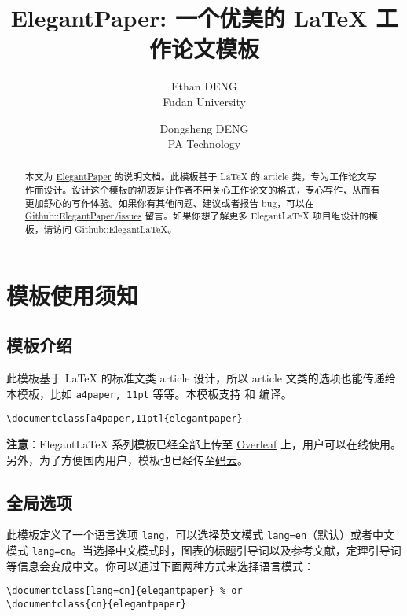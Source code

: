 \documentclass[lang=cn,11pt,a4paper]{elegantpaper}
\title{ElegantPaper: 一个优美的 \LaTeX{} 工作论文模板}
\author{Ethan DENG \\ Fudan University \and Dongsheng DENG \\ PA Technology}
\institute{\href{https://elegantlatex.org/}{Elegant\LaTeX{} 项目组}}
\date{\zhtoday}
\begin{document}
\maketitle

\begin{abstract}
本文为 \href{https://github.com/ElegantLaTeX/ElegantPaper/}{ElegantPaper} 的说明文档。此模板基于 \LaTeX{} 的 article 类，专为工作论文写作而设计。设计这个模板的初衷是让作者不用关心工作论文的格式，专心写作，从而有更加舒心的写作体验。如果你有其他问题、建议或者报告 bug，可以在 \href{https://github.com/ElegantLaTeX/ElegantPaper/issues}{Github::ElegantPaper/issues} 留言。如果你想了解更多 Elegant\LaTeX{} 项目组设计的模板，请访问 \href{https://github.com/ElegantLaTeX/}{Github::ElegantLaTeX}。
\end{abstract}



\section{模板使用须知}

\subsection{模板介绍}

此模板基于 \LaTeX{} 的标准文类 article 设计，所以 article 文类的选项也能传递给本模板，比如 \lstinline{a4paper, 11pt} 等等。本模板支持  和  编译。

\begin{lstlisting}
\documentclass[a4paper,11pt]{elegantpaper}
\end{lstlisting}

\textbf{注意}：Elegant\LaTeX{} 系列模板已经全部上传至 \href{https://www.overleaf.com/latex/templates/elegantpaper-template/yzghrqjhmmmr}{Overleaf} 上，用户可以在线使用。另外，为了方便国内用户，模板也已经传至\href{https://gitee.com/ElegantLaTeX/ElegantPaper}{码云}。


\subsection{全局选项}
此模板定义了一个语言选项 \lstinline{lang}，可以选择英文模式 \lstinline{lang=en}（默认）或者中文模式 \lstinline{lang=cn}。当选择中文模式时，图表的标题引导词以及参考文献，定理引导词等信息会变成中文。你可以通过下面两种方式来选择语言模式：
\begin{lstlisting}
\documentclass[lang=cn]{elegantpaper} % or
\documentclass{cn}{elegantpaper} 
\end{lstlisting}
\end{document}
